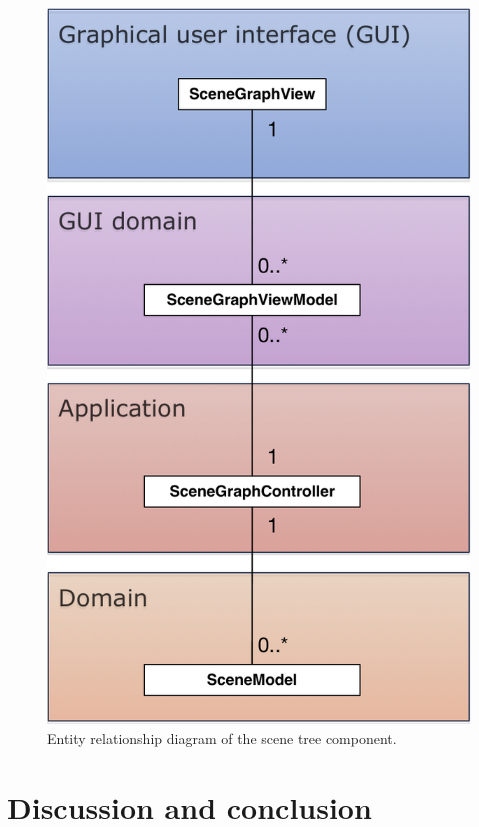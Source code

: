 \documentclass[%
    a4paper,    %
    justified,  %
    nobib,      %
    openany     %
]{tufte-book}
\begin{document}
\begin{figure}[ht]
  \caption{Entity relationship diagram of the scene tree component.}
  \label{fig:scene-graph-erd}
  \includegraphics[width=0.75\linewidth]{images/scene-graph-erd}
\end{figure}


\chapter{Discussion and conclusion}
\label{chap:discussion-conclusion}


\end{document}
